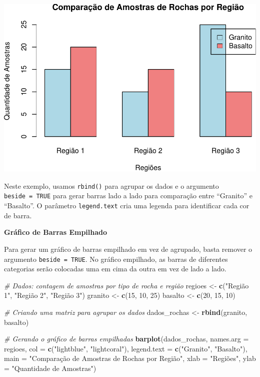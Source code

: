 \documentclass[
]{book}
\newenvironment{Shaded}{\begin{snugshade}}{\end{snugshade}}
\newcommand{\AttributeTok}[1]{\textcolor[rgb]{0.13,0.29,0.53}{#1}}
\newcommand{\CommentTok}[1]{\textcolor[rgb]{0.56,0.35,0.01}{\textit{#1}}}
\newcommand{\DecValTok}[1]{\textcolor[rgb]{0.00,0.00,0.81}{#1}}
\newcommand{\FunctionTok}[1]{\textcolor[rgb]{0.13,0.29,0.53}{\textbf{#1}}}
\newcommand{\NormalTok}[1]{#1}
\newcommand{\OtherTok}[1]{\textcolor[rgb]{0.56,0.35,0.01}{#1}}
\newcommand{\StringTok}[1]{\textcolor[rgb]{0.31,0.60,0.02}{#1}}
\begin{document}
\includegraphics{introR_files/figure-latex/unnamed-chunk-165-1.pdf}

Neste exemplo, usamos \texttt{rbind()} para agrupar os dados e o argumento \texttt{beside\ =\ TRUE} para gerar barras lado a lado para comparação entre ``Granito'' e ``Basalto''. O parâmetro \texttt{legend.text} cria uma legenda para identificar cada cor de barra.

\textbf{Gráfico de Barras Empilhado}

Para gerar um gráfico de barras empilhado em vez de agrupado, basta remover o argumento \texttt{beside\ =\ TRUE}. No gráfico empilhado, as barras de diferentes categorias serão colocadas uma em cima da outra em vez de lado a lado.

\begin{Shaded}
\begin{Highlighting}[]
\CommentTok{\# Dados: contagem de amostras por tipo de rocha e região}
\NormalTok{regioes }\OtherTok{\textless{}{-}} \FunctionTok{c}\NormalTok{(}\StringTok{"Região 1"}\NormalTok{, }\StringTok{"Região 2"}\NormalTok{, }\StringTok{"Região 3"}\NormalTok{)}
\NormalTok{granito }\OtherTok{\textless{}{-}} \FunctionTok{c}\NormalTok{(}\DecValTok{15}\NormalTok{, }\DecValTok{10}\NormalTok{, }\DecValTok{25}\NormalTok{)}
\NormalTok{basalto }\OtherTok{\textless{}{-}} \FunctionTok{c}\NormalTok{(}\DecValTok{20}\NormalTok{, }\DecValTok{15}\NormalTok{, }\DecValTok{10}\NormalTok{)}

\CommentTok{\# Criando uma matriz para agrupar os dados}
\NormalTok{dados\_rochas }\OtherTok{\textless{}{-}} \FunctionTok{rbind}\NormalTok{(granito, basalto)}

\CommentTok{\# Gerando o gráfico de barras empilhadas}
\FunctionTok{barplot}\NormalTok{(dados\_rochas, }
        \AttributeTok{names.arg =}\NormalTok{ regioes, }
        \AttributeTok{col =} \FunctionTok{c}\NormalTok{(}\StringTok{"lightblue"}\NormalTok{, }\StringTok{"lightcoral"}\NormalTok{), }
        \AttributeTok{legend.text =} \FunctionTok{c}\NormalTok{(}\StringTok{"Granito"}\NormalTok{, }\StringTok{"Basalto"}\NormalTok{),}
        \AttributeTok{main =} \StringTok{"Comparação de Amostras de Rochas por Região"}\NormalTok{, }
        \AttributeTok{xlab =} \StringTok{"Regiões"}\NormalTok{, }
        \AttributeTok{ylab =} \StringTok{"Quantidade de Amostras"}\NormalTok{)}
\end{Highlighting}
\end{Shaded}
\end{document}
